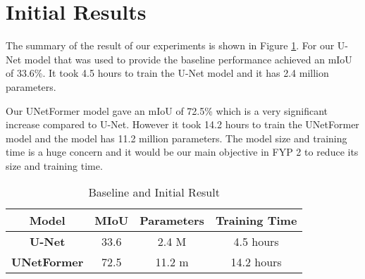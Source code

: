 \FloatBarrier

\section{Initial Results}

The summary of the result of our experiments is shown in Figure \ref{tab:result}. For our U-Net model that was used to provide the baseline performance achieved an mIoU of 33.6\%. It took 4.5 hours to train the U-Net model and it has 2.4 million parameters. 

Our UNetFormer model gave an mIoU of 72.5\% which is a very significant increase compared to U-Net. However it took 14.2 hours to train the UNetFormer model and the model has 11.2 million parameters. The model size and training time is a huge concern and it would be our main objective in FYP 2 to reduce its size and training time. 
\FloatBarrier
\begin{table}[!h]
\centering
\begin{tabular}{|c|c|c|c|}
\hline
\textbf{Model}      & \textbf{MIoU} & \textbf{Parameters} & \textbf{Training Time} \\ \hline
\textbf{U-Net}      & 33.6          & 2.4 M               & 4.5 hours              \\ \hline
\textbf{UNetFormer} & 72.5          & 11.2 m              & 14.2 hours             \\ \hline
\end{tabular}
\caption{Baseline and Initial Result}
\label{tab:result}
\end{table}
\FloatBarrier


